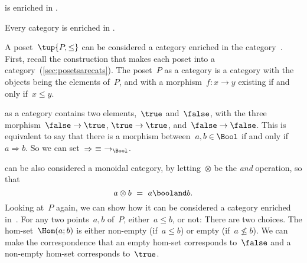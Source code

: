 {    \begin{example}
        \Category is enriched in \Category.
    \end{example}

    \begin{example}
        Every category is enriched in \Set.
    \end{example}

    \begin{example}
        A poset~$\tup{P, \leq}$ can be considered a category enriched in the category~\Bool.
        First, recall the construction that makes each poset into a category~(\cref{sec:posetsarecats}).
        The poset~$P$ as a category is a category with the objects being the elements of~$P$, and with a morphism~$f\colon x \to y$ existing if and only if~$x\leq y$.

        \Bool as a category contains two elements,~$\true$ and~$\false$, with the three morphism~$\false \to \true$, $\true \to \true$, and~$\false \to \false$.
        This is equivalent to say that there is a morphism between~$a, b \in \Bool$ if and only if~$a \Rightarrow b$.
        So we can set~$\Rightarrow\ \equiv\ \to_{\Bool}$.

        \Bool can be also considered a monoidal category, by letting~$\otimes$ be the \emph{and} operation, so that
        \begin{equation}
            a \otimes b\ =\ a \booland b.
        \end{equation}
        Looking at~$P$ again, we can show how it can be considered a category enriched in~\Bool.
        For any two points~$a, b$ of~$P$, either~$a \leq b$, or not: There are two choices.
        The hom-set~$\Hom(a; b)$ is either non-empty (if~$a \leq b$) or empty (if~$a \not\leq b$).
        We can make the correspondence that an empty hom-set corresponds to~$\false$ and a non-empty hom-set corresponds to~$\true$.


\end{example}}
